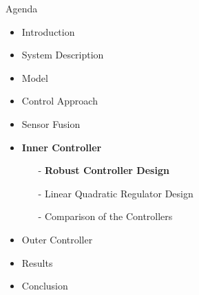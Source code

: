 \begin{frame}{Agenda}{}
    \begin{itemize}
        \item Introduction
        \item System Description
        \item Model
        \item Control Approach
        \item Sensor Fusion
        \item \textbf{Inner Controller}
        \begin{itemize}
            \item[-] \textbf{Robust Controller Design}
            \item[-] Linear Quadratic Regulator Design
            \item[-] Comparison of the Controllers
        \end{itemize}
        \item Outer Controller
        \item Results
        \item Conclusion
    \end{itemize}
\end{frame}
